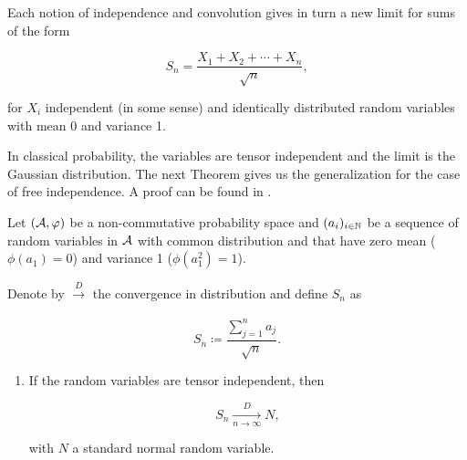    Each notion of independence and convolution gives in turn a new limit for sums of the form

    \[ S_n = \frac{X_1 + X_2 + \cdots + X_n}{\sqrt{n}}, \]

    \noindent for $X_i$ independent (in some sense) and identically distributed random variables with mean 0 and variance 1.

    In classical probability, the variables are tensor independent and the limit is the Gaussian distribution. The next Theorem gives us the generalization for the case of free independence. A proof can be found in \cite{book:nica_speicher}.

    \begin{theorem}
        Let $(\mathcal A,\varphi)$ be a non-commutative probability space and $(a_i)_{i\in \mathbb N}$ be a sequence of random variables in $\mathcal A$ with common distribution and that have zero mean ($\phi(a_1)=0$) and variance 1 ($\phi(a_1^2)=1$). 
        
        Denote by $\xrightarrow[]{D}$ the convergence in distribution and define $S_n$ as

        \[ S_n \coloneqq \frac{\sum_{j=1}^n a_j}{\sqrt{n}}.\]
        \begin{enumerate}
            \item If the random variables are tensor independent, then 
                
            \begin{equation*}
            S_n \xrightarrow[n\to\infty]{D} N,        
            \end{equation*}

            \noindent with $N$ a standard normal random variable.
            
            
            

            


\end{enumerate}
\end{theorem}
